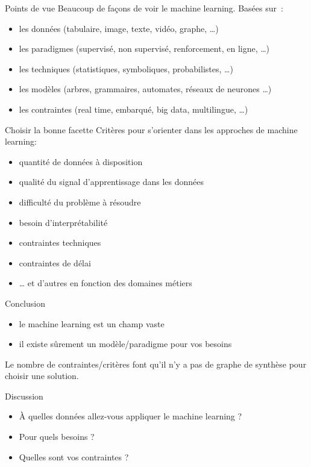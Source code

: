 \begin{frame}{Points de vue}
  Beaucoup de façons de voir le machine learning. Basées sur~:
  \begin{itemize}[<+->]
    \item les données (tabulaire, image, texte, vidéo, graphe, …)
    \item les paradigmes (supervisé, non supervisé, renforcement, en
      ligne, …)
    \item les techniques (statistiques, symboliques, probabilistes, …)
    \item les modèles (arbres, grammaires, automates, réseaux de
      neurones …)
    \item les contraintes (real time, embarqué, big data, multilingue,
      …)
  \end{itemize}
\end{frame}

\begin{frame}{Choisir la bonne facette}
  Critères pour s'orienter dans les approches de machine learning:
  \begin{itemize}[<+->]
  \item quantité de données à disposition
  \item qualité du signal d'apprentissage dans les données
  \item difficulté du problème à résoudre
  \item besoin d'interprétabilité
  \item contraintes techniques
  \item contraintes de délai
  \item … et d'autres en fonction des domaines métiers
  \end{itemize}
\end{frame}

\begin{frame}{Conclusion}
  \begin{itemize}
  \item le machine learning est un champ vaste
  \item il existe sûrement un modèle/paradigme pour vos besoins
  \end{itemize}
  Le nombre de contraintes/critères font qu'il n'y a pas de graphe de synthèse pour choisir une solution.
\end{frame}

\begin{frame}{Discussion}
  \begin{itemize}
  \item À quelles données allez-vous appliquer le machine learning ? 
  \item Pour quels besoins ?
  \item Quelles sont vos contraintes ?
  \end{itemize}
\end{frame}


